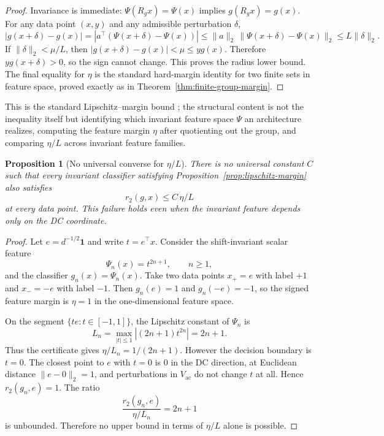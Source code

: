 \documentclass[11pt]{article}
\theoremstyle{plain}
\newtheorem{proposition}{Proposition}
\theoremstyle{definition}
\theoremstyle{remark}
\newcommand{\Vac}{V_{\mathrm{ac}}}
\newcommand{\one}{\mathbf 1}
\begin{document}
\begin{proof}
Invariance is immediate: $\Psi(R_gx)=\Psi(x)$ implies $g(R_gx)=g(x)$.  For any data point $(x,y)$ and any admissible perturbation $\delta$,
\[
|g(x+\delta)-g(x)|
=|a^\top(\Psi(x+\delta)-\Psi(x))|
\le \|a\|_2\,\|\Psi(x+\delta)-\Psi(x)\|_2
\le L\|\delta\|_2.
\]
If $\|\delta\|_2<\mu/L$, then $|g(x+\delta)-g(x)|<\mu\le y g(x)$.  Therefore $y g(x+\delta)>0$, so the sign cannot change.  This proves the radius lower bound.  The final equality for $\eta$ is the standard hard-margin identity for two finite sets in feature space, proved exactly as in Theorem~\ref{thm:finite-group-margin}.
\end{proof}

This is the standard Lipschitz--margin bound \citep{HeinAndriushchenko2017,Tsuzuku2018,Sokolic2016,Bartlett2017}; the structural content is not the inequality itself but identifying which invariant feature space $\Psi$ an architecture realizes, computing the feature margin $\eta$ after quotienting out the group, and comparing $\eta/L$ across invariant feature families.

\begin{proposition}[No universal converse for $\eta/L$]\label{prop:no-converse}
There is no universal constant $C$ such that every invariant classifier satisfying Proposition~\ref{prop:lipschitz-margin} also satisfies
\[
r_2(g,x)\le C\,\eta/L
\]
at every data point.  This failure holds even when the invariant feature depends only on the DC coordinate.
\end{proposition}

\begin{proof}
Let $e=d^{-1/2}\one$ and write $t=e^\top x$.  Consider the shift-invariant scalar feature
\[
\Psi_n(x)=t^{2n+1},\qquad n\ge1,
\]
and the classifier $g_n(x)=\Psi_n(x)$.  Take two data points $x_+=e$ with label $+1$ and $x_-=-e$ with label $-1$.  Then $g_n(e)=1$ and $g_n(-e)=-1$, so the signed feature margin is $\eta=1$ in the one-dimensional feature space.

On the segment $\{te: t\in[-1,1]\}$, the Lipschitz constant of $\Psi_n$ is
\[
L_n=\max_{|t|\le1}|(2n+1)t^{2n}|=2n+1.
\]
Thus the certificate gives $\eta/L_n=1/(2n+1)$.  However the decision boundary is $t=0$.  The closest point to $e$ with $t=0$ is $0$ in the DC direction, at Euclidean distance $\|e-0\|_2=1$, and perturbations in $\Vac$ do not change $t$ at all.  Hence $r_2(g_n,e)=1$.  The ratio
\[
\frac{r_2(g_n,e)}{\eta/L_n}=2n+1
\]
is unbounded.  Therefore no upper bound in terms of $\eta/L$ alone is possible.
\end{proof}
\end{document}
